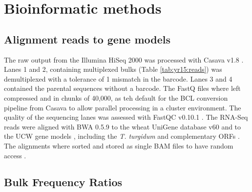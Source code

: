 \section{Bioinformatic methods}

\subsection{Alignment reads to gene models}

The raw output from the Illumina HiSeq 2000 was processed with Casava v1.8 \citep{casavaBCL}. 
Lanes 1 and 2, containing multiplexed bulks (Table \ref{tab:yr15:reads}) was demultiplexed with a tolerance of 1 mismatch in the barcode. 
Lanes 3 and 4 contained the parental sequences without a barcode. 
The FastQ files where left compressed and in chunks of 40,000, as teh default for the BCL conversion pipeline from Casava to allow parallel processing in a cluster environment. 
The quality of the sequencing lanes was assessed with FastQC v0.10.1 \citep{fastqc}. 
The RNA-Seq reads were aligned with BWA 0.5.9 \citep{Li2009} to the wheat UniGene database v60 \citep{PontiusJUWagnerL2002} and to the UCW gene models \citep{Krasileva2013}, including the \textit{T. turgidum} and complementary ORFs \citep{MASWheat2013}.
The alignments where sorted and stored as single BAM files to have random access \citep{Li2009a}. 


\subsection{Bulk Frequency Ratios}
\label{yr15:sub:bfr}


